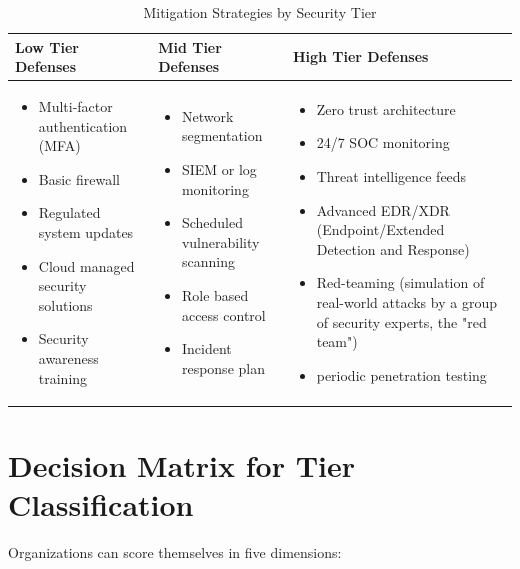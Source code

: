\documentclass{article}
\begin{document}
\begin{table}[H]
\centering
\renewcommand{\arraystretch}{1.4}
\begin{tabular}{|p{4cm}|p{4cm}|p{4cm}|}
\hline
\textbf{Low Tier Defenses} & \textbf{Mid Tier Defenses} & \textbf{High Tier Defenses} \\ \hline

\begin{itemize}
    \item Multi-factor authentication (MFA)
    \item Basic firewall
    \item Regulated system updates
    \item Cloud managed security solutions
    \item Security awareness training
\end{itemize}
&
\begin{itemize}
    \item Network segmentation
    \item SIEM or log monitoring
    \item Scheduled vulnerability scanning
    \item Role based access control
    \item Incident response plan
\end{itemize}
&
\begin{itemize}
    \item Zero trust architecture
    \item 24/7 SOC monitoring
    \item Threat intelligence feeds
    \item Advanced EDR/XDR (Endpoint/Extended Detection and Response)
    \item Red-teaming (simulation of real-world attacks by a group of security experts, the "red team")
    \item periodic penetration testing
\end{itemize}
\\ \hline
\end{tabular}
\caption{Mitigation Strategies by Security Tier}
\end{table}

\section{Decision Matrix for Tier Classification}

Organizations can score themselves in five dimensions:
\end{document}
